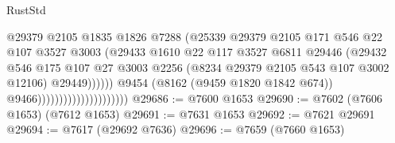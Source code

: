\begin{lexlean}{RustStd}
\begin{coremodule}
                                                    @29379
                                                    @2105
                                                    @1835
                                                    @1826
                                                    @7288
                                                    (@25339
                                                      @29379
                                                      @2105
                                                      @171
                                                      @546
                                                      @22
                                                      @107
                                                      @3527
                                                      @3003
                                                      (@29433
                                                        @1610
                                                        @22
                                                        @117
                                                        @3527
                                                        @6811
                                                        @29446
                                                        (@29432
                                                          @546
                                                          @175
                                                          @107
                                                          @27
                                                          @3003
                                                          @2256
                                                          (@8234
                                                            @29379
                                                            @2105
                                                            @543
                                                            @107
                                                            @3002
                                                            @12106)
                                                          @29449))))))
                                              @9454
                                              (@8162 (@9459 @1820 @1842 @674))
                                              @9466)))))))))))))))))))))
@29686 := @7600 @1653
@29690 := @7602 (@7606 @1653) (@7612 @1653)
@29691 := @7631 @1653
@29692 := @7621 @29691
@29694 := @7617 (@29692 @7636)
@29696 := @7659 (@7660 @1653)

\end{coremodule}
\end{lexlean}
